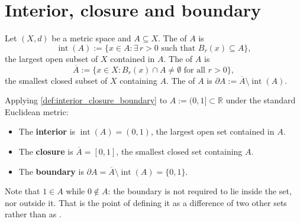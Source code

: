\section{Interior, closure and boundary}
\label{sec:interior_closure_boundary}

\begin{definition}
\label{def:interior_closure_boundary}
Let $(X,d)$ be a metric space and $A \subseteq X$. The 
 of $A$ is
\[\operatorname{int}(A) := \{x \in A : \exists\, r>0 \text{ such that } B_r(x) \subseteq A\},\]
the largest open subset of $X$ contained in $A$. The   of
$A$ is
\[\overline{A} := \{x \in X : B_r(x) \cap A \neq \emptyset \text{ for all } r > 0\},\]
the smallest closed subset of $X$ containing $A$. The   of
$A$ is $\partial A := \overline{A} \setminus \operatorname{int}(A)$.
\end{definition}

\begin{aiexample}
Applying \cref{def:interior_closure_boundary} to $A := (0,1] \subset \mathbb{R}$ under the
standard Euclidean metric:
\begin{itemize}
  \item The \textbf{interior} is $\operatorname{int}(A) = (0,1)$, the largest open set contained in $A$.
  \item The \textbf{closure} is $\overline{A} = [0,1]$, the smallest closed set containing $A$.
  \item The \textbf{boundary} is $\partial A = \overline{A} \setminus \operatorname{int}(A) = \{0, 1\}$.
\end{itemize}
Note that $1 \in A$ while $0 \notin A$: the boundary is not required to lie inside the set, nor
outside it. That is the point of defining it as a difference of two other sets rather than as
.
\end{aiexample}

